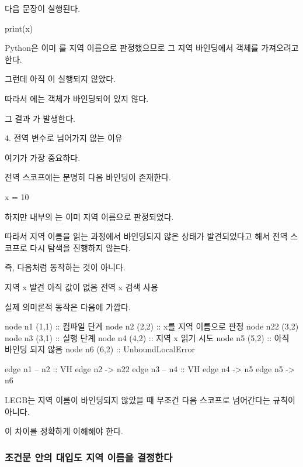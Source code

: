 다음 문장이 실행된다.

\begin{dhkcode}
print(x)
\end{dhkcode}

Python은 이미 를 지역 이름으로 판정했으므로 그 지역 바인딩에서 객체를 가져오려고 한다.

그런데 아직 이 실행되지 않았다.

따라서 에는 객체가 바인딩되어 있지 않다.

그 결과 가 발생한다.

\begin{dhknote}
\begin{dhksmry}[centered]
4. 전역 변수로 넘어가지 않는 이유
\end{dhksmry}
\end{dhknote}

여기가 가장 중요하다.

전역 스코프에는 분명히 다음 바인딩이 존재한다.

\begin{dhkcode}
x = 10
\end{dhkcode}

하지만  내부의 는 이미 지역 이름으로 판정되었다.

따라서 지역 이름을 읽는 과정에서 바인딩되지 않은 상태가 발견되었다고 해서 전역 스코프로 다시 탐색을 진행하지 않는다.

즉, 다음처럼 동작하는 것이 아니다.

\begin{dhksmry}[centered]
지역 x 발견
\da
아직 값이 없음
\da
전역 x 검색
 사용
\end{dhksmry}

실제 의미론적 동작은 다음에 가깝다.

\begin{dhkdiagram}[in=6]
node n1 (1,1) :: 컴파일 단계
node n2 (2,2) :: x를 지역 이름으로 판정
node n22 (3,2)
node n3 (3,1) :: 실행 단계
node n4 (4,2) :: 지역 x 읽기 시도
node n5 (5,2) :: 아직 바인딩 되지 않음
node n6 (6,2) :: UnboundLocalError

edge n1 -- n2 :: VH
edge n2 -> n22
edge n3 -- n4 :: VH
edge n4 -> n5
edge n5 -> n6
\end{dhkdiagram}

LEGB는 지역 이름이 바인딩되지 않았을 때 무조건 다음 스코프로 넘어간다는 규칙이 아니다.

이 차이를 정확하게 이해해야 한다.

\subsubsection{조건문 안의 대입도 지역 이름을 결정한다}


